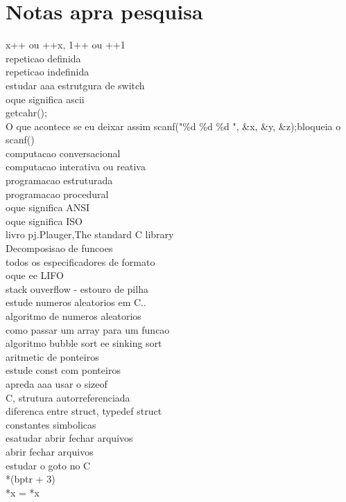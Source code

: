 \documentclass[a4paper,12pt]{article}
\begin{document}
\section*{Notas apra pesquisa}
x++ ou ++x, 1++ ou ++1\\   
repeticao definida\\ 
repeticao indefinida\\ 
estudar aaa estrutgura de switch\\ 
oque significa ascii\\ 
getcahr();\\ 
O que acontece se eu deixar assim scanf("\%d \%d \%d ", \&x, \&y, \&z);\dotfill bloqueia o scanf()\\ 
computacao conversacional\\  
computacao interativa ou reativa\\ 
programacao estruturada\\ 
programacao procedural\\  
oque significa ANSI\\  
oque significa ISO\\ 
livro pj.Plauger,The standard C library\\ 
Decomposisao de funcoes \\ 
todos os especificadores de formato\\ 
oque ee LIFO\\ 
stack ouverflow - estouro de pilha\\ 
estude numeros aleatorios em C..\\ 
algoritmo de numeros aleatorios\\ 
como passar um array para um funcao\\ 
algoritmo bubble sort ee sinking sort\\ 
aritmetic de ponteiros\\ 
estude const com ponteiros\\ 
apreda aaa usar o sizeof\\ 
C, strutura autorreferenciada\\ 
diferenca entre struct, typedef struct\\ 
constantes simbolicas\\ 
esatudar abrir fechar arquivos\\ 
abrir fechar arquivos \\ 
estudar o goto no C\\ 
*(bptr + 3)\\ 
 *x = *x\\ 
\end{document}
